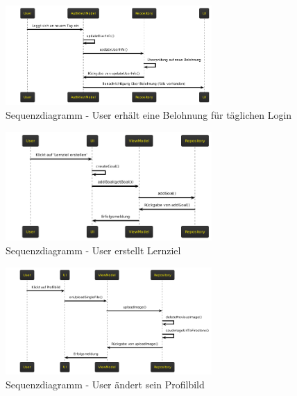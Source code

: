 \begin{figure}[H]
    \centering
    \includegraphics[width=0.7\textwidth]{images/diagramme/sequenzdiagramme/user_login_belohnung.png}
    \caption{Sequenzdiagramm - User erhält eine Belohnung für täglichen Login}
    \label{fig:sequenz_user_login_belohnung}
\end{figure} 
\begin{figure}[H]
    \centering
    \includegraphics[width=0.7\textwidth]{images/diagramme/sequenzdiagramme/user_erstellt_lernziel.png}
    \caption{Sequenzdiagramm - User erstellt Lernziel}
    \label{fig:sequenz_user_erstellt_lernziel}
\end{figure} 
\begin{figure}[H]
    \centering
    \includegraphics[width=0.7\textwidth]{images/diagramme/sequenzdiagramme/user_aendert_profilbild.png}
    \caption{Sequenzdiagramm - User ändert sein Profilbild}
    \label{fig:sequenz_user_aendert_profilbild}
\end{figure} 
